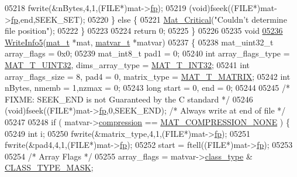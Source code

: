 \begin{DoxyCode}
{{{{{{{{{{{{{{{{{{{{{{{{{{{{{{{05218         fwrite(&nBytes,4,1,(FILE*)mat->\hyperlink{struct__mat__t_a85f562e407ca9ad4d2a6e14f839432b7}{fp});
05219         (void)fseek((FILE*)mat->\hyperlink{struct__mat__t_a85f562e407ca9ad4d2a6e14f839432b7}{fp},end,SEEK\_SET);
05220     \} \textcolor{keywordflow}{else} \{
05221         \hyperlink{group__mat__util_gaf51f2bfbb5580f575e4dd79757e2b80c}{Mat\_Critical}(\textcolor{stringliteral}{"Couldn't determine file position"});
05222     \}
05223 
05224     \textcolor{keywordflow}{return} 0;
05225 \}
05226 
05235 \textcolor{keywordtype}{void}
\hyperlink{mat5_8c_a80e4ba45ec110d05657f8f39ffd9ee27}{05236} \hyperlink{mat5_8c_a80e4ba45ec110d05657f8f39ffd9ee27}{WriteInfo5}(\hyperlink{struct__mat__t}{mat\_t} *mat, \hyperlink{group___m_a_t_structmatvar__t}{matvar\_t} *matvar)
05237 \{
05238     mat\_uint32\_t array\_flags = 0x0;
05239     mat\_int8\_t pad1 = 0;
05240     \textcolor{keywordtype}{int} array\_flags\_type = \hyperlink{group___m_a_t_ggacf7b3b879282b7ab3a51190e49bf3453aa397e285a23fe240368b752897652c6a}{MAT\_T\_UINT32}, dims\_array\_type = 
      \hyperlink{group___m_a_t_ggacf7b3b879282b7ab3a51190e49bf3453a83e06a68320726c6572bfbb9f3addb1d}{MAT\_T\_INT32};
05241     \textcolor{keywordtype}{int} array\_flags\_size = 8, pad4 = 0, matrix\_type = \hyperlink{group___m_a_t_ggacf7b3b879282b7ab3a51190e49bf3453a32985fee89a4df8db4b3f5d3a48823d3}{MAT\_T\_MATRIX};
05242     \textcolor{keywordtype}{int} nBytes, nmemb = 1,nzmax = 0;
05243     \textcolor{keywordtype}{long} start = 0, end = 0;
05244 
05245     \textcolor{comment}{/* FIXME: SEEK\_END is not Guaranteed by the C standard */}
05246     (void)fseek((FILE*)mat->\hyperlink{struct__mat__t_a85f562e407ca9ad4d2a6e14f839432b7}{fp},0,SEEK\_END);         \textcolor{comment}{/* Always write at end of file */}
05247 
05248     \textcolor{keywordflow}{if} ( matvar->\hyperlink{group___m_a_t_aeef0466048621cb2c959ba7f6c774d06}{compression} == \hyperlink{group___m_a_t_gga768c318af97bd2567758ecb001ceb7f4a2280b97631ff5dd24dec55261dc587b6}{MAT\_COMPRESSION\_NONE} ) \{
05249         \textcolor{keywordtype}{int} i;
05250         fwrite(&matrix\_type,4,1,(FILE*)mat->\hyperlink{struct__mat__t_a85f562e407ca9ad4d2a6e14f839432b7}{fp});
05251         fwrite(&pad4,4,1,(FILE*)mat->\hyperlink{struct__mat__t_a85f562e407ca9ad4d2a6e14f839432b7}{fp});
05252         start = ftell((FILE*)mat->\hyperlink{struct__mat__t_a85f562e407ca9ad4d2a6e14f839432b7}{fp});
05253 
05254         \textcolor{comment}{/* Array Flags */}
05255         array\_flags = matvar->\hyperlink{group___m_a_t_aff13035bf3265dd7d9425e5d40c839d4}{class\_type} & \hyperlink{mat5_8c_a24b94e17e9c34b9c795798099c710751}{CLASS\_TYPE\_MASK};
}}}}}}}}}}}}}}}}}}}}}}}}}}}}}}}
\end{DoxyCode}
